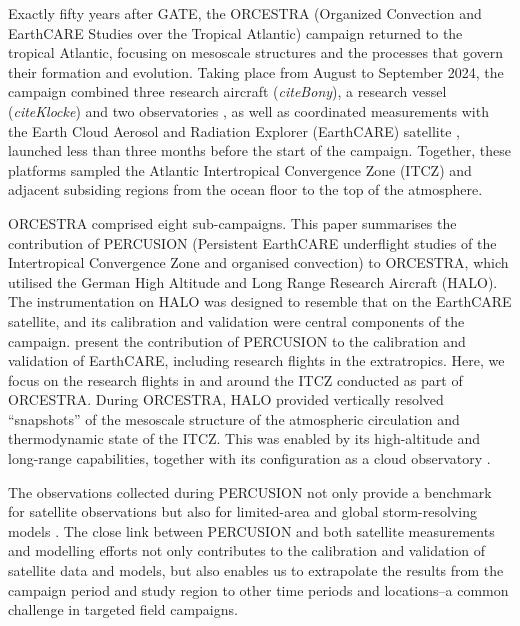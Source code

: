 \documentclass{article}
\begin{document}
Exactly fifty years after GATE, the ORCESTRA (Organized Convection and EarthCARE Studies over the Tropical Atlantic) campaign \citep{stevensORCESTRAOrganizedConvection2026} returned to the tropical Atlantic, focusing on mesoscale structures and the processes that govern their formation and evolution.
Taking place from August to September 2024, the campaign combined three research aircraft (\textit{citeBony}), a research vessel (\textit{citeKlocke}) and two observatories \citep{winklerRAPSODIRadiosondeAtmospheric2026}, as well as coordinated measurements with the Earth Cloud Aerosol and Radiation Explorer (EarthCARE) satellite \citep{illingworthEarthCARESatelliteNext2015}, launched less than three months before the start of the campaign. 
Together, these platforms sampled the Atlantic Intertropical Convergence Zone (ITCZ) and adjacent subsiding regions from the ocean floor to the top of the atmosphere. 

ORCESTRA comprised eight sub-campaigns.
This paper summarises the contribution of PERCUSION (Persistent EarthCARE underflight studies of the Intertropical Convergence Zone and organised convection) to ORCESTRA, which utilised the German High Altitude and Long Range Research Aircraft (HALO).
The instrumentation on HALO was designed to resemble that on the EarthCARE satellite, and its calibration and validation were central components of the campaign.
\cite{grossPersistentEarthCAREUnderflight2026} present the contribution of PERCUSION to the calibration and validation of EarthCARE, including research flights in the extratropics.
Here, we focus on the research flights in and around the ITCZ conducted as part of ORCESTRA.
During ORCESTRA, HALO provided vertically resolved ``snapshots” of the mesoscale structure of the atmospheric circulation and thermodynamic state of the ITCZ.
This was enabled by its high-altitude and long-range capabilities, together with its configuration as a cloud observatory \citep{stevensHighAltitudeLongRangeAircraft2019, bonyMeasuringAreaAveragedVertical2019, georgeJOANNEJointDropsonde2021}.

The observations collected during PERCUSION not only provide a benchmark for satellite observations but also for limited-area and global storm-resolving models \citep[e.g.,][]{Klocke2017a, satohGlobalCloudResolvingModels2019, fievetTropicalConvectionStormresolving2026}.
The close link between PERCUSION and both satellite measurements and modelling efforts not only contributes to the calibration and validation of satellite data and models, but also enables us to extrapolate the results from the campaign period and study region to other time periods and locations--a common challenge in targeted field campaigns.
\end{document}
